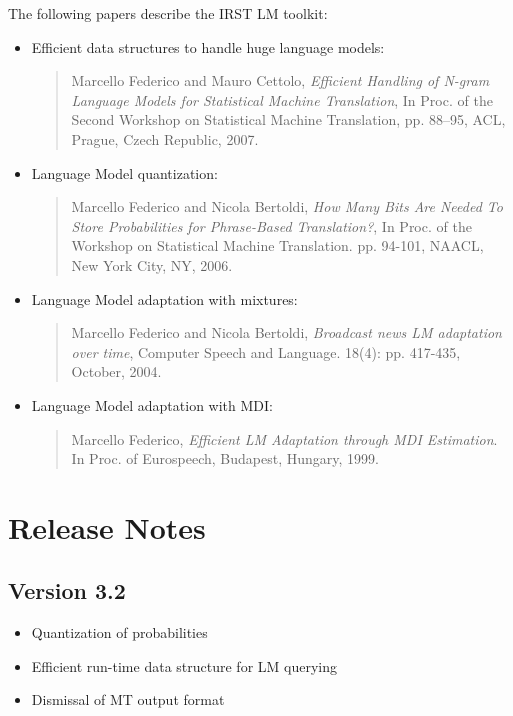 \documentclass[11pt]{article}
\begin{document}
\noindent
The following papers describe the IRST LM toolkit:
\begin{itemize}

\item Efficient data structures to handle huge language models:
\begin{quote}
Marcello Federico and Mauro Cettolo, {\em Efficient Handling of N-gram Language Models for Statistical Machine Translation}, In Proc. of the Second Workshop on Statistical Machine Translation, pp. 88--95, ACL, Prague, Czech Republic, 2007.
\end{quote}

\item Language Model quantization:
\begin{quote}
Marcello Federico and Nicola Bertoldi, {\em How Many Bits Are Needed To Store Probabilities for Phrase-Based Translation?}, In Proc. of the Workshop on Statistical Machine Translation. pp. 94-101, NAACL, New York City, NY, 2006. 
\end{quote}


\item Language Model adaptation with mixtures:
\begin{quote}
Marcello Federico and Nicola Bertoldi, {\em Broadcast news LM adaptation over time}, Computer Speech and Language. 18(4): pp. 417-435, October, 2004.
\end{quote}
\item Language Model adaptation with MDI:
\begin{quote}
Marcello Federico, {\em Efficient LM Adaptation through MDI Estimation}. In Proc. of Eurospeech, Budapest, Hungary, 1999.
\end{quote}
\end{itemize}

\newpage
\section{Release Notes}

\subsection{Version 3.2}
\begin{itemize}
\item Quantization of probabilities
\item Efficient run-time data structure for LM querying 
\item Dismissal of MT output format
\end{itemize}
\end{document}
